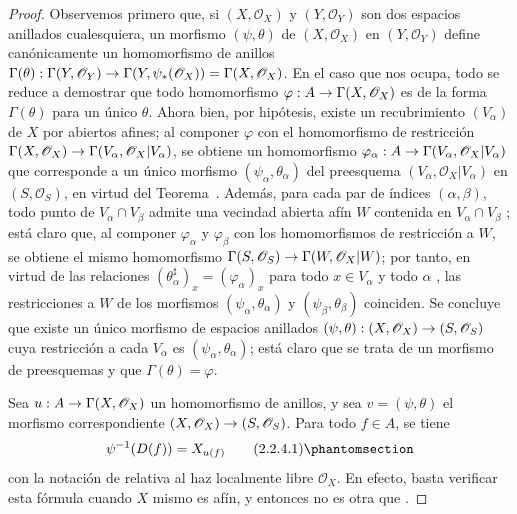 \documentclass[oneside]{amsart}
\theoremstyle{ega-env-style}
\theoremstyle{ega-thm-env-style}
\theoremstyle{ega-defn-env-style}
\renewcommand{\to}{\mathchoice{\longrightarrow}{\rightarrow}{\rightarrow}{\rightarrow}}
\let\EGAOriginalLabel\label
\renewcommand{\label}[1]{\phantomsection\EGAOriginalLabel{#1}}
\begin{document}
\begin{proof}
Observemos primero que, si $(X,\mathscr{O}_X)$ y $(Y,\mathscr{O}_Y)$ son dos espacios anillados cualesquiera,
un morfismo $(\psi,\theta)$ de $(X,\mathscr{O}_X)$ en $(Y,\mathscr{O}_Y)$ define canónicamente un homomorfismo de anillos $\Gamma(\theta):\Gamma(Y,\mathscr{O}_Y)\to
\Gamma(Y,\psi_*(\mathscr{O}_X))=\Gamma(X,\mathscr{O}_X)$.
En el caso que nos ocupa, todo se reduce a demostrar que todo homomorfismo $\varphi:A\to\Gamma(X,\mathscr{O}_X)$ es de la forma $\Gamma(\theta)$ para un único $\theta$.
Ahora bien, por hipótesis, existe un recubrimiento $(V_\alpha)$ de $X$ por abiertos afines;
al componer $\varphi$ con el homomorfismo de restricción $\Gamma(X,\mathscr{O}_X)\to
\Gamma(V_\alpha,\mathscr{O}_X|V_\alpha)$, se obtiene un homomorfismo $\varphi_\alpha:A\to\Gamma(V_\alpha,\mathscr{O}_X|V_\alpha)$ que corresponde a un único morfismo $(\psi_\alpha,\theta_\alpha)$ del preesquema $(V_\alpha,\mathscr{O}_X|V_\alpha)$ en $(S,\mathscr{O}_S)$, en virtud del Teorema~.
Además, para cada par de índices $(\alpha,\beta)$, todo punto de $V_\alpha\cap V_\beta$ admite una vecindad abierta afín $W$ contenida en $V_\alpha\cap V_\beta$ ;
está claro que, al componer $\varphi_\alpha$ y $\varphi_\beta$ con los homomorfismos de restricción a $W$, se obtiene el mismo homomorfismo $\Gamma(S,\mathscr{O}_S)\to\Gamma(W,\mathscr{O}_X|W)$; por tanto, en virtud de las relaciones $(\theta_\alpha^\sharp)_x=(\varphi_\alpha)_x$ para todo $x\in V_\alpha$ y todo $\alpha$ , las restricciones a $W$ de los morfismos $(\psi_\alpha,\theta_\alpha)$ y $(\psi_\beta,\theta_\beta)$ coinciden.
Se concluye que existe un único morfismo de espacios anillados $(\psi,\theta):(X,\mathscr{O}_X)\to(S,\mathscr{O}_S)$ cuya restricción a cada $V_\alpha$ es $(\psi_\alpha,\theta_\alpha)$; está claro que se trata de un morfismo de preesquemas y que $\Gamma(\theta)=\varphi$.

Sea $u:A\to\Gamma(X,\mathscr{O}_X)$ un homomorfismo de anillos, y sea $v=(\psi,\theta)$ el morfismo correspondiente $(X,\mathscr{O}_X)\to(S,\mathscr{O}_S)$.
Para todo $f\in A$, se tiene
\begin{equation}
  \psi^{-1}(D(f))=X_{u(f)}
  \tag{2.2.4.1}\label{I.2.2.4.1-fr}
\end{equation}
con la notación de  relativa al haz localmente libre $\mathscr{O}_X$.
En efecto, basta verificar esta fórmula cuando $X$ mismo es afín, y entonces no es otra que .
\end{proof}
\end{document}
